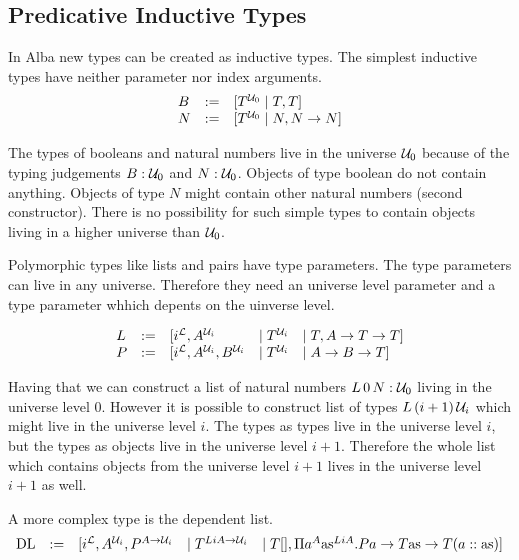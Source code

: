 \subsection{Predicative Inductive Types}

In Alba new types can be created as inductive types. The simplest inductive
types have neither parameter nor index arguments.
$$
\begin{array}{lll}
    B &:=& [T^{{\cal U}_0} \mid T, T]
    \\
    N &:=& [T^{{\cal U}_0} \mid N, N \to N]
\end{array}
$$

The types of booleans and natural numbers live in the universe ${\cal U}_0$ because
of the typing judgements $B: {\cal U}_0$ and $N: {\cal U}_0$. Objects of type boolean do
not contain anything. Objects of type $N$ might contain other natural numbers
(second constructor). There is no possibility for such simple types to contain
objects living in a higher universe than ${\cal U}_0$.

Polymorphic types like lists and pairs have type parameters. The type parameters
can live in any universe. Therefore they need an universe level parameter and a
type parameter whhich depents on the uinverse level.

$$
\begin{array}{lllll}
    L &:=& [i^{\cal L}, A^{{\cal U}_i} &\mid T^{{\cal U}_i} &\mid T, A \to T \to T]
    \\
    P &:=& [i^{\cal L}, A^{{\cal U}_i}, B^{{\cal U}_i} &\mid T^{{\cal U}_i} &\mid A \to B \to T]
\end{array}
$$

Having that we can construct a list of natural numbers $L\,0\,N: {\cal U}_0$ living
in the universe level $0$. However it is possible to construct list of types
$L\,(i+1)\,{\cal U}_i$ which might live in the universe level $i$. The types as
types live in the universe level $i$, but the types as objects live in the
universe level $i+1$. Therefore the whole list which contains objects from the
universe level $i + 1$ lives in the universe level $i+1$ as well.


A more complex type is the dependent list.
$$
\begin{array}{lllll}
    \text{DL} &:=&
    [
        i^{\cal L}, A^{{\cal U}_i}, P^{A \to {\cal U}_i}
        &\mid
        T^{LiA \to {\cal U}_i}
        &\mid
        T[],
        \Pi a^A \text{as}^{LiA}.
            Pa \to T\text{as} \to T(a :: \text{as})
    ]
\end{array}
$$

